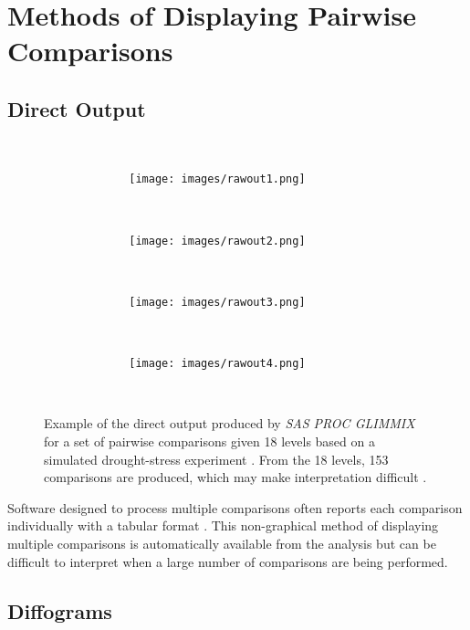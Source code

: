 \documentclass{article}
\begin{document}
\section{Methods of Displaying Pairwise Comparisons}

\subsection{Direct Output}


\begin{figure}[H]
    \centering
    \begin{minipage}{0.25\textwidth}
        \centering
        \texttt{[image: images/rawout1.png]}
        \label{fig:compute1}
    \end{minipage}
    \hfill
    \begin{minipage}{0.25\textwidth}
        \centering
        \texttt{[image: images/rawout2.png]}
        \label{fig:compute2}
    \end{minipage}
\end{figure}

\begin{figure}[H]
    \centering
    \begin{minipage}{0.25\textwidth}
        \centering
        \texttt{[image: images/rawout3.png]}
        \label{fig:compute1}
    \end{minipage}
    \hfill
    \begin{minipage}{0.25\textwidth}
        \centering
        \texttt{[image: images/rawout4.png]}
        \label{fig:compute2}
    \end{minipage}
    \caption{Example of the direct output produced by \emph{SAS PROC GLIMMIX} for a set of pairwise comparisons given 18 levels based on a simulated drought-stress experiment \cite{procGlimmy}. From the 18 levels, 153 comparisons are produced, which may make interpretation difficult \cite{CLDVsLines}.}
\end{figure}


Software designed to process multiple comparisons often reports each comparison individually with a tabular format \cite{procGlimmy}. This non-graphical method of displaying multiple comparisons is automatically available from the analysis but can be difficult to interpret when a large number of comparisons are being performed. 


\subsection{Diffograms}
\end{document}
